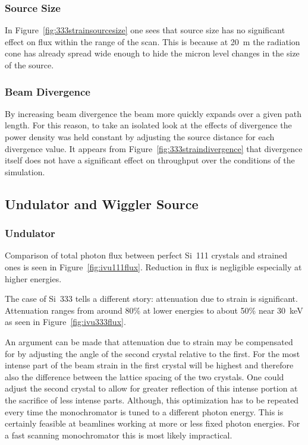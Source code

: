 \documentclass{iucr}
\begin{document}
\subsubsection{Source Size}
In Figure~\ref{fig:333strainsourcesize} one sees that source size has no significant effect on flux within the range of the scan. This is because at 20~m the radiation cone has already spread wide enough to hide the micron level changes in the size of the source.

\subsubsection{Beam Divergence}
By increasing beam divergence the beam more quickly expands over a given path length. For this reason, to take an isolated look at the effects of divergence the power density was held constant by adjusting the source distance for each divergence value. It appears from Figure~\ref{fig:333straindivergence} that divergence itself does not have a significant effect on throughput over the conditions of the simulation.

\subsection{Undulator and Wiggler Source}\label{undulatorwiggler}

\subsubsection{Undulator}
Comparison of total photon flux between perfect Si~111 crystals and strained ones is seen in Figure~\ref{fig:ivu111flux}. Reduction in flux is negligible especially at higher energies.

The case of Si~333 tells a different story: attenuation due to strain is significant. Attenuation ranges from around 80\% at lower energies to about 50\% near 30~keV as seen in Figure~\ref{fig:ivu333flux}.

An argument can be made that attenuation due to strain may be compensated for by adjusting the angle of the second crystal relative to the first. For the most intense part of the beam strain in the first crystal will be highest and therefore also the difference between the lattice spacing of the two crystals. One could adjust the second crystal to allow for greater reflection of this intense portion at the sacrifice of less intense parts. Although, this optimization has to be repeated every time the monochromator is tuned to a different photon energy. This is certainly feasible at beamlines working at more or less fixed photon energies. For a fast scanning monochromator this is most likely impractical.
\end{document}
